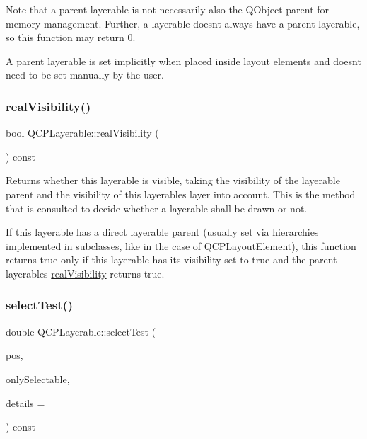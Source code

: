 Note that a parent layerable is not necessarily also the Q\+Object parent for memory management. Further, a layerable doesn\textquotesingle{}t always have a parent layerable, so this function may return 0.

A parent layerable is set implicitly when placed inside layout elements and doesn\textquotesingle{}t need to be set manually by the user. \mbox{\label{classQCPLayerable_ab054e88f15d485defcb95e7376f119e7}} 
\subsubsection{\texorpdfstring{real\+Visibility()}{realVisibility()}}
{\footnotesize\ttfamily bool Q\+C\+P\+Layerable\+::real\+Visibility (\begin{DoxyParamCaption}{ }\end{DoxyParamCaption}) const}

Returns whether this layerable is visible, taking the visibility of the layerable parent and the visibility of this layerable\textquotesingle{}s layer into account. This is the method that is consulted to decide whether a layerable shall be drawn or not.

If this layerable has a direct layerable parent (usually set via hierarchies implemented in subclasses, like in the case of \hyperlink{classQCPLayoutElement}{Q\+C\+P\+Layout\+Element}), this function returns true only if this layerable has its visibility set to true and the parent layerable\textquotesingle{}s \hyperlink{classQCPLayerable_ab054e88f15d485defcb95e7376f119e7}{real\+Visibility} returns true. \mbox{\label{classQCPLayerable_a04db8351fefd44cfdb77958e75c6288e}} 
\subsubsection{\texorpdfstring{select\+Test()}{selectTest()}}
{\footnotesize\ttfamily double Q\+C\+P\+Layerable\+::select\+Test (\begin{DoxyParamCaption}\item[{const Q\+PointF \&}]{pos,  }\item[{bool}]{only\+Selectable,  }\item[{Q\+Variant $\ast$}]{details = {} }\end{DoxyParamCaption}) const\hspace{0.3cm}{\ttfamily [virtual]}}

